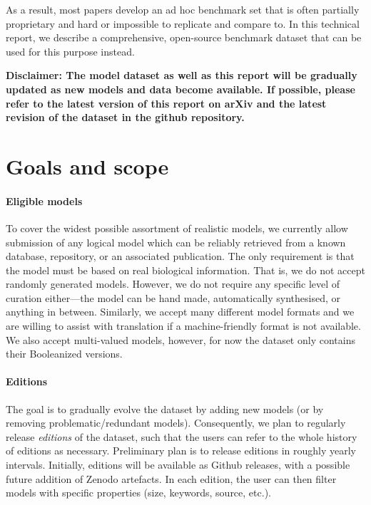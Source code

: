 \documentclass{article}
\begin{document}
As a result, most papers develop an ad hoc benchmark set that is often partially proprietary and hard or impossible to replicate and compare to. In this technical report, we describe a comprehensive, open-source benchmark dataset that can be used for this purpose instead.

\textbf{Disclaimer: The model dataset as well as this report will be gradually updated as new models and data become available. If possible, please refer to the latest version of this report on arXiv and the latest revision of the dataset in the github repository.}

\section{Goals and scope}

\paragraph{Eligible models} To cover the widest possible assortment of realistic models, we currently allow submission of any logical model which can be reliably retrieved from a known database, repository, or an associated publication. The only requirement is that the model must be based on real biological information. That is, we do not accept randomly generated models. However, we do not require any specific level of curation either---the model can be hand made, automatically synthesised, or anything in between. Similarly, we accept many different model formats and we are willing to assist with translation if a machine-friendly format is not available. We also accept multi-valued models, however, for now the dataset only contains their Booleanized versions.

\paragraph{Editions} The goal is to gradually evolve the dataset by adding new models (or by removing problematic/redundant models). Consequently, we plan to regularly release \emph{editions} of the dataset, such that the users can refer to the whole history of editions as necessary. Preliminary plan is to release editions in roughly yearly intervals. Initially, editions will be available as Github releases, with a possible future addition of Zenodo artefacts. In each edition, the user can then filter models with specific properties (size, keywords, source, etc.).
\end{document}
